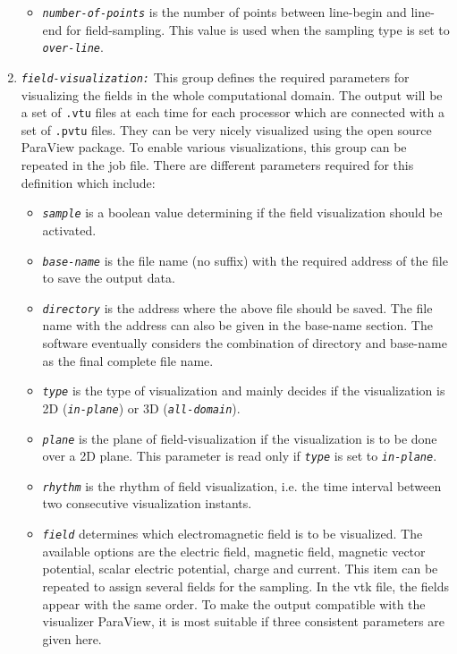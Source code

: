 \begin{enumerate}
\begin{itemize}
	\item {\tt \small \em number-of-points} is the number of points between line-begin and line-end for field-sampling. This value is used when the sampling type is set to {\tt \small \em over-line}.
\end{itemize}
\item {\tt \small \em field-visualization:} This group defines the required parameters for visualizing the fields in the whole computational domain. The output will be a set of \texttt{.vtu} files at each time for each processor which are connected with a set of \texttt{.pvtu} files. They can be very nicely visualized using the open source ParaView package. To enable various visualizations, this group can be repeated in the job file. There are different parameters required for this definition which include:
%
\begin{itemize}
	\item {\tt \small \em sample} is a boolean value determining if the field visualization should be activated.
	\item {\tt \small \em base-name} is the file name (no suffix) with the required address of the file to save the output data.
	\item {\tt \small \em directory} is the address where the above file should be saved. The file name with the address can also be given in the base-name section. The software eventually considers the combination of directory and base-name as the final complete file name.
	\item {\tt \small \em type} is the type of visualization and mainly decides if the visualization is 2D ({\tt \small \em in-plane}) or 3D ({\tt \small \em all-domain}).
	\item {\tt \small \em plane} is the plane of field-visualization if the visualization is to be done over a 2D plane. This parameter is read only if {\tt \small \em type} is set to {\tt \small \em in-plane}.
	\item {\tt \small \em rhythm} is the rhythm of field visualization, i.e. the time interval between two consecutive visualization instants.
	\item {\tt \small \em field} determines which electromagnetic field is to be visualized. The available options are the electric field, magnetic field, magnetic vector potential, scalar electric potential, charge and current. This item can be repeated to assign several fields for the sampling. In the vtk file, the fields appear with the same order. To make the output compatible with the visualizer ParaView, it is most suitable if three consistent parameters are given here.

\end{itemize}
\end{enumerate}
